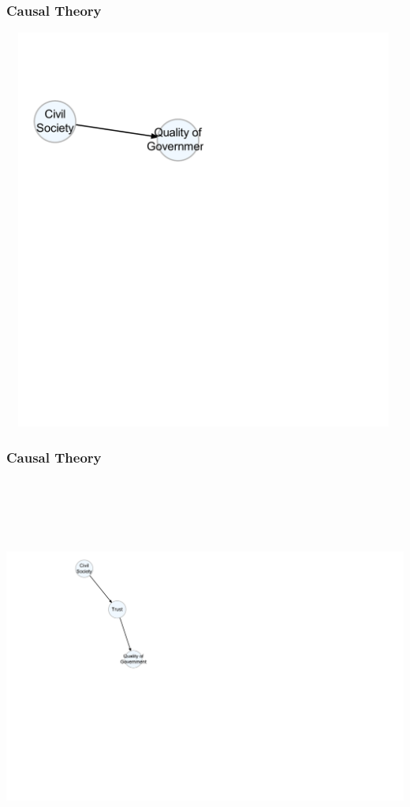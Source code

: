 \documentclass[xcolor=x11names,compress]{beamer}\usepackage[]{graphicx}\usepackage[]{color}
\newenvironment{knitrout}{}{} %
\renewcommand{\(}{\begin{columns}}
\renewcommand{\)}{\end{columns}}
\newcommand{\<}[1]{\begin{column}{#1}}
\renewcommand{\>}{\end{column}}
\begin{document}
\begin{frame}
\frametitle{Causal Theory}
\begin{knitrout}
\color{fgcolor}

{\centering \includegraphics[width=500,height=500]{figure/unnamed-chunk-1-1} 

}



\end{knitrout}
\end{frame}

\begin{frame}
\frametitle{Causal Theory}
\begin{knitrout}
\color{fgcolor}

{\centering \includegraphics[width=800,height=500]{figure/unnamed-chunk-2-1} 

}



\end{knitrout}
\end{frame}
\end{document}
